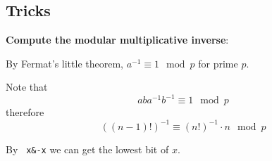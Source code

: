 \documentclass[11pt]{article}
\let\OldTexttt\texttt
\renewcommand{\texttt}[1]{\OldTexttt{\color{MidnightBlue} #1}}
\begin{document}
\subsection{Tricks}
\label{sec:org5b1d6e2}
\textbf{Compute the modular multiplicative inverse}:

By Fermat's little theorem, \(a^{-1}\equiv 1\mod p\) for prime \(p\).

Note that
\begin{equation*}
aba^{-1}b^{-1}\equiv 1\mod p
\end{equation*}
therefore
\begin{equation*}
((n-1)!)^{-1}\equiv(n!)^{-1}\cdot n\mod p
\end{equation*}

By \texttt{x\&-x} we can get the lowest bit of \(x\).
\end{document}
